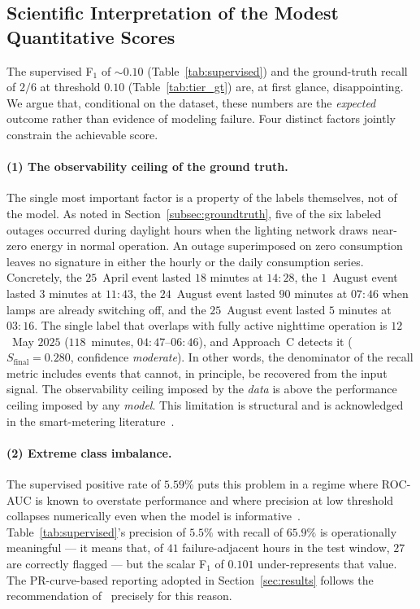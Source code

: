 \documentclass[11pt]{article}
\begin{document}
\begin{enumerate}[leftmargin=1.5em,itemsep=1pt]
\subsection{Scientific Interpretation of the Modest Quantitative Scores}
\label{subsec:low_scores}

The supervised F$_1$ of $\sim 0.10$ (Table~\ref{tab:supervised}) and the ground-truth recall of $2/6$ at threshold $0.10$ (Table~\ref{tab:tier_gt}) are, at first glance, disappointing. We argue that, conditional on the dataset, these numbers are the \emph{expected} outcome rather than evidence of modeling failure. Four distinct factors jointly constrain the achievable score.

\paragraph{(1) The observability ceiling of the ground truth.}
The single most important factor is a property of the labels themselves, not of the model. As noted in Section~\ref{subsec:groundtruth}, five of the six labeled outages occurred during daylight hours when the lighting network draws near-zero energy in normal operation. An outage superimposed on zero consumption leaves no signature in either the hourly or the daily consumption series. Concretely, the $25$~April event lasted $18$ minutes at $14{:}28$, the $1$~August event lasted $3$ minutes at $11{:}43$, the $24$~August event lasted $90$ minutes at $07{:}46$ when lamps are already switching off, and the $25$~August event lasted $5$ minutes at $03{:}16$. The single label that overlaps with fully active nighttime operation is $12$~May $2025$ ($118$~minutes, $04{:}47$--$06{:}46$), and Approach~C detects it ($S_{\text{final}}=0.280$, confidence \emph{moderate}). In other words, the denominator of the recall metric includes events that cannot, in principle, be recovered from the input signal. The observability ceiling imposed by the \emph{data} is above the performance ceiling imposed by any \emph{model}. This limitation is structural and is acknowledged in the smart-metering literature~\cite{himeur2021survey}.

\paragraph{(2) Extreme class imbalance.}
The supervised positive rate of $5.59\%$ puts this problem in a regime where ROC-AUC is known to overstate performance and where precision at low threshold collapses numerically even when the model is informative~\cite{saito2015precision,hand2009measuring}. Table~\ref{tab:supervised}'s precision of $5.5\%$ with recall of $65.9\%$ is operationally meaningful --- it means that, of $41$ failure-adjacent hours in the test window, $27$ are correctly flagged --- but the scalar F$_1$ of $0.101$ under-represents that value. The PR-curve-based reporting adopted in Section~\ref{sec:results} follows the recommendation of~\cite{saito2015precision} precisely for this reason.


\end{enumerate}
\end{document}
